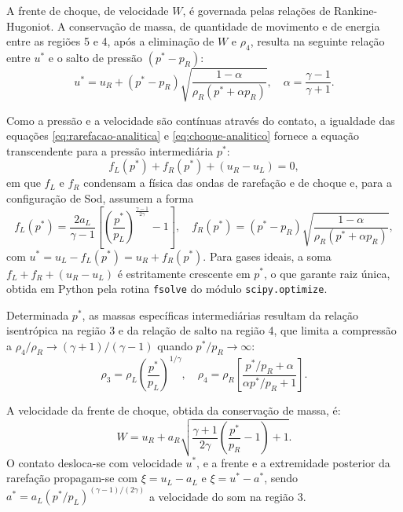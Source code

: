 A frente de choque, de velocidade $W$, é governada pelas relações de Rankine-Hugoniot.
A conservação de massa, de quantidade de movimento e de energia entre as regiões 5 e 4, após a eliminação de $W$ e $\rho_4$, resulta na seguinte relação entre $u^\ast$ e o salto de pressão $(p^\ast - p_R)$:
\begin{equation}
    u^\ast = u_R + (p^\ast - p_R) \sqrt{ \frac{1 - \alpha}{\rho_R (p^\ast + \alpha p_R)} }, \quad \alpha = \frac{\gamma - 1}{\gamma + 1}. \label{eq:choque-analitico}
\end{equation}

Como a pressão e a velocidade são contínuas através do contato, a igualdade das equações \eqref{eq:rarefacao-analitica} e \eqref{eq:choque-analitico} fornece a equação transcendente para a pressão intermediária $p^\ast$:
\begin{equation}
    f_L(p^\ast) + f_R(p^\ast) + (u_R - u_L) = 0, \label{eq:equacao-transcendente}
\end{equation}
em que $f_L$ e $f_R$ condensam a física das ondas de rarefação e de choque e, para a configuração de Sod, assumem a forma
\begin{equation}
    f_L(p^\ast) = \frac{2 a_L}{\gamma - 1} \left[ \left( \frac{p^\ast}{p_L} \right)^{\frac{\gamma - 1}{2\gamma}} - 1 \right], \quad f_R(p^\ast) = (p^\ast - p_R) \sqrt{ \frac{1 - \alpha}{\rho_R (p^\ast + \alpha p_R)} }, \label{eq:funcoes-onda}
\end{equation}
com $u^\ast = u_L - f_L(p^\ast) = u_R + f_R(p^\ast)$.
Para gases ideais, a soma $f_L + f_R + (u_R - u_L)$ é estritamente crescente em $p^\ast$, o que garante raiz única, obtida em Python pela rotina \texttt{fsolve} do módulo \texttt{scipy.optimize}.

Determinada $p^\ast$, as massas específicas intermediárias resultam da relação isentrópica na região 3 e da relação de salto na região 4, que limita a compressão a $\rho_4/\rho_R \to (\gamma+1)/(\gamma-1)$ quando $p^\ast/p_R \to \infty$:
\begin{equation}
    \rho_3 = \rho_L \left( \frac{p^\ast}{p_L} \right)^{1/\gamma}, \quad \rho_4 = \rho_R \left[ \frac{p^\ast / p_R + \alpha}{\alpha p^\ast / p_R + 1} \right].
\end{equation}

A velocidade da frente de choque, obtida da conservação de massa, é:
\begin{equation}
    W = u_R + a_R \sqrt{ \frac{\gamma + 1}{2\gamma} \left( \frac{p^\ast}{p_R} - 1 \right) + 1 }.
\end{equation}
O contato desloca-se com velocidade $u^\ast$, e a frente e a extremidade posterior da rarefação propagam-se com $\xi = u_L - a_L$ e $\xi = u^\ast - a^\ast$, sendo $a^\ast = a_L (p^\ast / p_L)^{(\gamma-1)/(2\gamma)}$ a velocidade do som na região 3.

